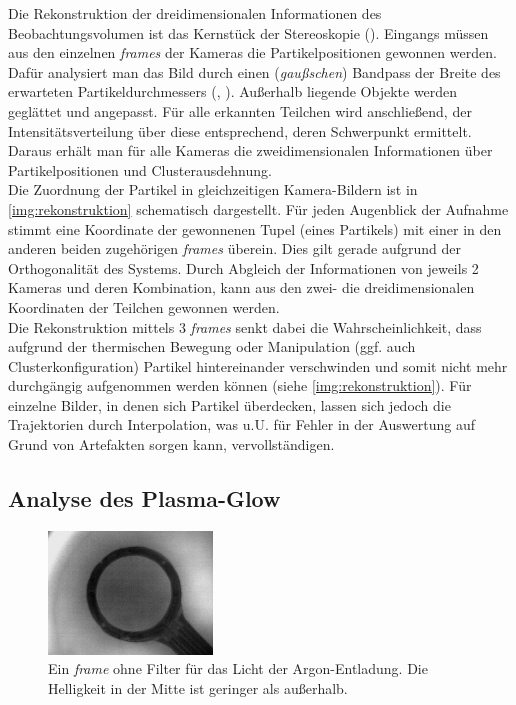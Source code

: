 \documentclass[numbers=noenddot,a4paper]{scrartcl}
\newcommand{\tilt}[1]{\textit{#1}}
\begin{document}
					Die Rekonstruktion der dreidimensionalen Informationen des Beobachtungsvolumen ist das Kernst\"uck der Stereoskopie (\cite{Bonitz10}). Eingangs m\"ussen aus den einzelnen \tilt{frames} der Kameras die Partikelpositionen gewonnen werden. Daf\"ur analysiert man das Bild durch einen (\tilt{gau{\ss}schen}) Bandpass der Breite des erwarteten Partikeldurchmessers (\cite{Crocker96a}, \cite{Ivanov07}). Au{\ss}erhalb liegende Objekte werden gegl\"attet und angepasst. F\"ur alle erkannten Teilchen wird anschlie{\ss}end, der Intensit\"atsverteilung \"uber diese entsprechend, deren Schwerpunkt ermittelt. Daraus erh\"alt man f\"ur alle Kameras die zweidimensionalen Informationen \"uber Partikelpositionen und Clusterausdehnung.\\
					Die Zuordnung der Partikel in gleichzeitigen Kamera-Bildern ist in \ref{img:rekonstruktion} schematisch dargestellt. F\"ur jeden Augenblick der Aufnahme stimmt eine Koordinate der gewonnenen Tupel (eines Partikels) mit einer in den anderen beiden zugeh\"origen \tilt{frames} \"uberein. Dies gilt gerade aufgrund der Orthogonalität des Systems. Durch Abgleich der Informationen von jeweils 2 Kameras und deren Kombination, kann aus den zwei- die dreidimensionalen Koordinaten der Teilchen gewonnen werden.\\
					Die Rekonstruktion mittels 3 \tilt{frames} senkt dabei die Wahrscheinlichkeit, dass aufgrund der thermischen Bewegung oder Manipulation (ggf. auch Clusterkonfiguration) Partikel hintereinander verschwinden und somit nicht mehr durchg\"angig aufgenommen werden k\"onnen (siehe \ref{img:rekonstruktion}). F\"ur einzelne Bilder, in denen sich Partikel \"uberdecken, lassen sich jedoch die Trajektorien durch Interpolation, was u.U. f\"ur Fehler in der Auswertung auf Grund von Artefakten sorgen kann, vervollst\"andigen.

		\subsection{Analyse des Plasma-Glow} \label{sub:glow}

			\begin{figure}
				\centering
				\includegraphics[width=0.39\textwidth,height=0.3\textwidth]{figs/ringplasmglowoben.png}
				\caption{Ein \tilt{frame} ohne Filter für das Licht der Argon-Entladung. Die Helligkeit in der Mitte ist geringer als außerhalb.}
				\label{img:glow}
                \vspace{-0.5cm}
			\end{figure}
\end{document}
